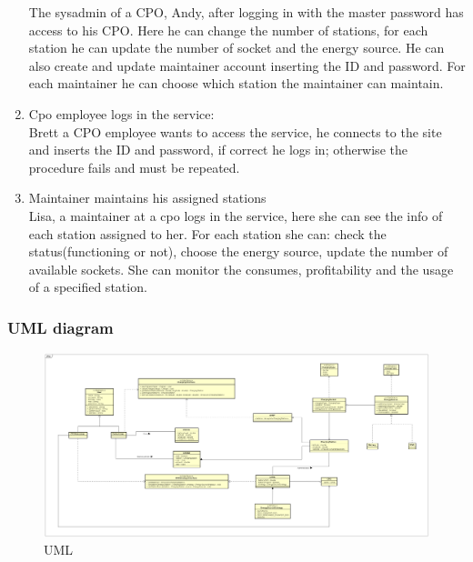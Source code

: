 \begin{enumerate}[label=\textbf{S\arabic*}]
            The sysadmin of a CPO, Andy, after logging in with the master password has access to his CPO.
            Here he can change the number of stations, for each station he can update the number of socket and the energy source.
            He can also create and update maintainer account inserting the ID and password. For each maintainer he can choose which station the maintainer can maintain.
      \item Cpo employee logs in the service:\\
            Brett a CPO employee wants to access the service, he connects to the site and inserts the ID
            and password, if correct he logs in; otherwise the procedure fails and must be repeated.
      \item Maintainer maintains his assigned stations\\
            Lisa, a maintainer at a cpo logs in the service, here she can see the info of each station assigned to her.
            For each station she can: check the status(functioning or not), choose the energy source, update the number of available sockets.
            She can monitor the consumes, profitability and the usage of a specified station.
\end{enumerate}

\clearpage
{}
\subsubsection{UML diagram}
\begin{figure}[h!]
      \begin{center}
            \includegraphics[keepaspectratio, width=16cm]{UML.png}
            \caption{UML}
      \end{center}
\end{figure}

